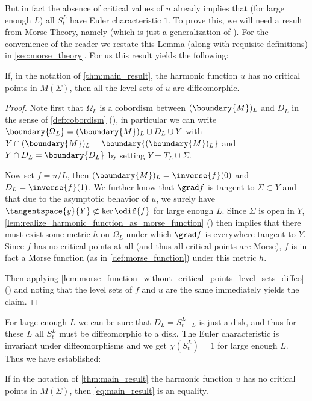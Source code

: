 \documentclass[titlepage,numbers=noenddot,oneside,%
cleardoublepage=empty,paper=a4,fontsize=11pt,%
english,%
]{scrartcl}
\begin{document}
But in fact the absence of critical values of \( u \) already implies that (for large enough \( L \)) all \( S_t^L \) have Euler characteristic \( 1 \). To prove this, we will need a result from Morse Theory, namely \cite[Lemma 2-10]{borodzikMorseTheoryManifolds2016} (which is just a generalization of \cite[Theorem 3.1]{milnorMorseTheory1973}). For the convenience of the reader we restate this Lemma (along with requisite definitions) in \cref{sec:morse_theory}. For us this result yields the following:
\begin{lemma}\label{lem:morse_lemma}
    If, in the notation of \cref{thm:main_result}, the harmonic function \( u \) has no critical points in \( M(\Sigma) \), then all the level sets of \( u \) are diffeomorphic.
\end{lemma}
\begin{proof}
    Note first that \( \Omega_L \) is a cobordism between \( (\boundary{M})_L \) and \( D_L \) in the sense of \cref{def:cobordism} (\cite[Definition 1-1]{borodzikMorseTheoryManifolds2016}), \ie in particular we can write \( \boundary{\Omega_L}=(\boundary{M})_L\cup D_L\cup Y \) with \( Y\cap (\boundary{M})_L=\boundary{(\boundary{M})_L} \) and \( Y\cap D_L=\boundary{D_L} \) by setting \( Y=T_L\cup \Sigma \). 

    Now set \( f=u/L \), then \( (\boundary{M})_L=\inverse{f}(0) \) and \( D_L=\inverse{f}(1) \). We further know that \( \grad f \) is tangent to \( \Sigma\subset Y \) and that due to the asymptotic behavior of \( u \), we surely have \( \tangentspace{y}{Y}\not\subset \ker{\odif{f}} \) for large enough \( L \). Since \( \Sigma \) is open in \( Y \), \cref{lem:realize_harmonic_function_as_morse_function} (\cite[Lemma 1-7]{borodzikMorseTheoryManifolds2016}) then implies that there must exist some metric \( h \) on \( \Omega_L \) under which \( \grad f \) is everywhere tangent to \( Y \). Since \( f \) has no critical points at all (and thus all critical points are Morse), \( f \) is in fact a Morse function (as in \cref{def:morse_function}) under this metric \( h \).

    Then applying \cref{lem:morse_function_without_critical_points_level_sets_diffeo} (\cite[Lemma 2-10]{borodzikMorseTheoryManifolds2016}) and noting that the level sets of \( f \) and \( u \) are the same immediately yields the claim.
\end{proof}
For large enough \( L \) we can be sure that \( D_L=S_{t=L}^L \) is just a disk, and thus for these \( L \) all \( S_t^L \) must be diffeomorphic to a disk. The Euler characteristic is invariant under diffeomorphisms and we get \( \chi(S_t^L)=1 \) for large enough \( L \). Thus we have established:
\begin{theorem}\label{thm:equality_condition}
    If in the notation of \cref{thm:main_result} the harmonic function \( u \) has no critical points in \( M(\Sigma) \), then \cref{eq:main_result} is an equality.
\end{theorem}
\end{document}
